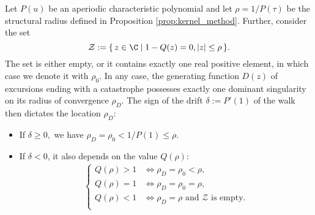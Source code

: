 \begin{lemma}
\label{lemma:radius_conv}
  Let $P(u)$ be an aperiodic characteristic polynomial and let $\rho =  1/P(\tau)$ be the structural radius defined in Proposition \ref{prop:kernel_method}.
  Further, consider the set 
  $$
  \mathcal{Z} := \{\, z \in \C \mid 1  - Q(z) = 0, |z| \leq \rho \,\}.
  $$
  The set is either empty, or it contains exactly one real positive element, in which case we denote it with $\rho_0$.
  In any case, the generating function $D(z)$ of excursions ending with a catastrophe possesses exactly one dominant singularity on its radius of convergence $\rho_D$. The sign of the drift $\delta := P'(1)$ of the walk then dictates the location $\rho_D$:

  \begin{itemize}
    \item If $\delta \geq 0,$ we have $\rho_D = \rho_0 < 1/P(1) \leq \rho.$
    \item If $\delta < 0$, it also depends on the value $Q(\rho):$
    \begin{align*}
      \begin{cases}
        Q(\rho) > 1 & \iff \rho_D = \rho_0 < \rho, \\
        Q(\rho) = 1 & \iff \rho_D = \rho_0 = \rho, \\
        Q(\rho) < 1 & \iff \text{$\rho_D = \rho$ and $\mathcal{Z}$ is empty.} \\
      \end{cases}
    \end{align*}
  \end{itemize}
\end{lemma}

